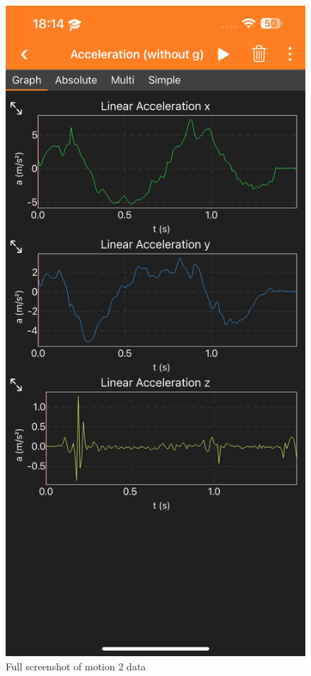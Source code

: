 \documentclass[idxtotoc,hyperref,openany]{labbook} %
\begin{document}
\begin{figure}[H] %
\begin{center}
\includegraphics[width=.55\linewidth]{images/Lab.03/Lab03Motion2.PNG}
\end{center}
\caption{Full screenshot of motion 2 data}
\label{fig:Lab03-Motion2}
\end{figure}
\end{document}
